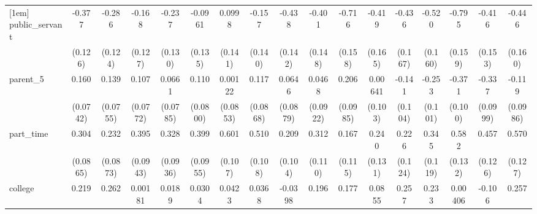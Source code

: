 {\begin{tabular}{l*{16}{c}}
[1em]
public\_servant      &      -0.377\sym{**} &      -0.286\sym{*}  &      -0.168         &      -0.237         &     -0.0961         &      0.0998         &      -0.157         &      -0.438\sym{**} &      -0.401\sym{**} &      -0.716\sym{***}&      -0.419\sym{*}  &      -0.436\sym{**} &      -0.520\sym{**} &      -0.795\sym{***}&      -0.416\sym{**} &      -0.446\sym{**} \\
                    &     (0.126)         &     (0.124)         &     (0.127)         &     (0.130)         &     (0.135)         &     (0.141)         &     (0.140)         &     (0.142)         &     (0.148)         &     (0.158)         &     (0.165)         &     (0.167)         &     (0.160)         &     (0.159)         &     (0.153)         &     (0.160)         \\
[1em]
parent\_5            &       0.160\sym{*}  &       0.139         &       0.107         &      0.0661         &       0.110         &     0.00122         &       0.117         &      0.0646         &      0.0468         &       0.206\sym{*}  &     0.00641         &      -0.141         &      -0.253\sym{*}  &      -0.371\sym{***}&      -0.337\sym{***}&      -0.119         \\
                    &    (0.0742)         &    (0.0755)         &    (0.0772)         &    (0.0785)         &    (0.0800)         &    (0.0853)         &    (0.0868)         &    (0.0879)         &    (0.0922)         &    (0.0985)         &     (0.103)         &     (0.104)         &     (0.101)         &     (0.100)         &    (0.0999)         &    (0.0986)         \\
[1em]
part\_time           &       0.304\sym{***}&       0.232\sym{**} &       0.395\sym{***}&       0.328\sym{***}&       0.399\sym{***}&       0.601\sym{***}&       0.510\sym{***}&       0.209\sym{*}  &       0.312\sym{**} &       0.167         &       0.240         &       0.226         &       0.345\sym{**} &       0.582\sym{***}&       0.457\sym{***}&       0.570\sym{***}\\
                    &    (0.0865)         &    (0.0873)         &    (0.0943)         &    (0.0936)         &    (0.0955)         &     (0.107)         &     (0.108)         &     (0.104)         &     (0.110)         &     (0.115)         &     (0.131)         &     (0.124)         &     (0.119)         &     (0.132)         &     (0.126)         &     (0.127)         \\
[1em]
college             &       0.219\sym{*}  &       0.262\sym{**} &     0.00181         &      0.0189         &      0.0304         &      0.0423         &      0.0368         &     -0.0398         &       0.196         &       0.177         &      0.0855         &       0.257\sym{*}  &       0.233         &     0.00406         &      -0.106         &       0.257         \\

\end{tabular}}
